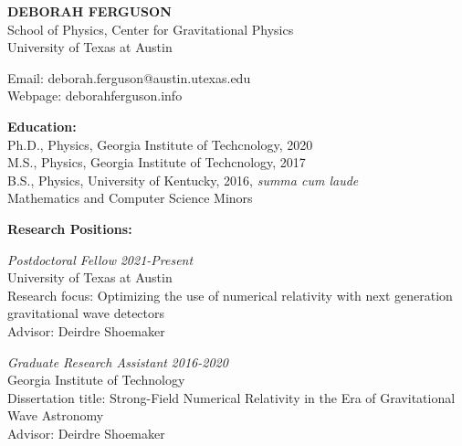 \documentclass[11pt]{article}
\begin{document}
%	
\begin{center}
  \textbf{DEBORAH FERGUSON}\\
  School of Physics, Center for Gravitational Physics\\
  University of Texas at Austin\\
\end{center}  

\begin{flushleft}

  Email: deborah.ferguson@austin.utexas.edu\\
  Webpage: deborahferguson.info\\
  \vspace{8px}
  
  \textbf{Education:}\\
  Ph.D., Physics, Georgia Institute of Techcnology, 2020\\
  M.S., Physics, Georgia Institute of Techcnology, 2017\\
  B.S., Physics, University of Kentucky, 2016, \textit{summa cum laude} \\ Mathematics and Computer Science Minors\\

\vspace{8px}

  \textbf{Research Positions:}\\
  \vspace{4px}
 
  \textit{Postdoctoral Fellow} \hfill \textit{2021-Present} \\
  University of Texas at Austin\\
  Research focus: Optimizing the use of numerical relativity with next generation\\ gravitational wave detectors\\
  Advisor: Deirdre Shoemaker\\
  
 \vspace{8px}  
  
  \textit{Graduate Research Assistant} \hfill \textit{2016-2020}\\
  Georgia Institute of Technology\\
  Dissertation title: Strong-Field Numerical Relativity in the Era of Gravitational\\ Wave Astronomy\\
  Advisor: Deirdre Shoemaker\\
  

\end{flushleft}
\end{document}
